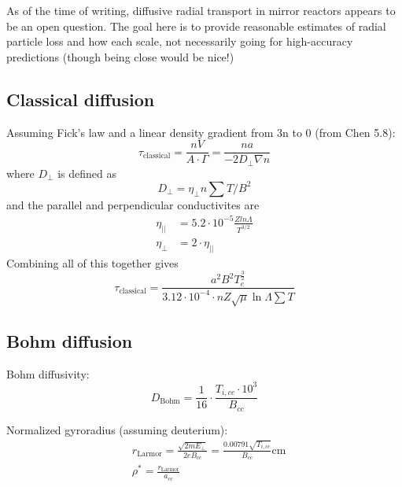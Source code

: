 As of the time of writing, diffusive radial transport in mirror reactors appears to be an open question. The goal here is to provide reasonable estimates of radial particle loss and how each scale, not necessarily going for high-accuracy predictions (though being close would be nice!)

\subsection{Classical diffusion}
Assuming Fick's law and a linear density gradient from 3n to 0 (from Chen 5.8): 
\begin{equation}
    \tau_\text{classical} = \frac{n V}{A \cdot \Gamma} = \frac{n a}{-2 D_\perp \nabla n}
\end{equation}
where $D_\perp$ is defined as 
\begin{equation}
    D_\perp = \eta_\perp n \sum T / B^2
\end{equation}
and the parallel and perpendicular conductivites are
\begin{align}
    \eta_{||} &= 5.2 \cdot 10^{-5} \frac{Z ln \Lambda}{T^{3/2}} \\
    \eta_{\perp} &= 2 \cdot \eta_{||}
\end{align}
Combining all of this together gives
\begin{equation}
    \tau_\text{classical} = \frac{a^2 B^2 T_e^{\frac{3}{2}}}{3.12 \cdot 10^{-4} \cdot n Z \sqrt{\mu} \ln{\Lambda} \sum{T}}
\end{equation}

\subsection{Bohm diffusion}
Bohm diffusivity:
\begin{equation}
    D_\text{Bohm} = \frac{1}{16} \cdot \frac{T_{i,cc} \cdot 10^3}{B_{cc}}
\end{equation}

Normalized gyroradius (assuming deuterium):
\begin{align}
    & r_\text{Larmor} = \frac{\sqrt{2 m E_\perp}}{2eB_{cc}} = \frac{0.00791 \sqrt{T_{i,cc}}}{B_{cc}}\text{cm} \\
    & \rho^* = \frac{r_\text{Larmor}}{a_{cc}}
\end{align}

